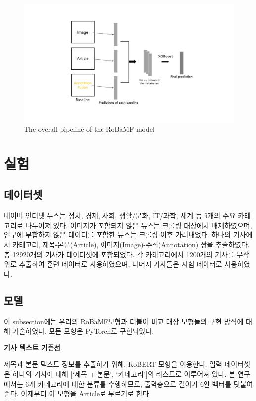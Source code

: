 \documentclass{article}
\begin{document}
\begin{figure}[ht]
    \centering
    \includegraphics[width=\columnwidth]{ENG/fig.1.jpg}
    \caption{The overall pipeline of the RoBaMF model}
    \label{fig.1}
\end{figure}

\section{실험}
\subsection{데이터셋}
네이버 인터넷 뉴스는 정치, 경제, 사회, 생활/문화, IT/과학, 세계 등 6개의 주요 카테고리로 나누어져 있다. 이미지가 포함되지 않은 뉴스는 크롤링 대상에서 배제하였으며, 연구에 부합하지 않은 데이터를 포함한 뉴스는 크롤링 이후 가려내었다. 
하나의 기사에서 카테고리, 제목-본문(Article), 이미지(Image)-주석(Annotation) 쌍을 추출하였다.
총 12920개의 기사가 데이터셋에 포함되었다. 각 카테고리에서 1200개의 기사를 무작위로 추출하여 훈련 데이터로 사용하였으며, 나머지 기사들은 시험 데이터로 사용하였다.


\subsection{모델}
이 subsection에는 우리의 RoBaMF모형과 더불어 비교 대상 모형들의 구현 방식에 대해 기술하였다. 모든 모형은 PyTorch로 구현되었다.


\textbf{기사 텍스트 기준선}

제목과 본문 텍스트 정보를 추출하기 위해, KoBERT 모형을 이용한다.
입력 데이터셋은 하나의 기사에 대해 [‘제목 + 본문’, ‘카테고리’]의 리스트로 이루어져 있다.
본 연구에서는 6개 카테고리에 대한 분류를 수행하므로, 출력층으로 길이가 6인 벡터를 덧붙여준다.
이제부터 이 모형을 Article로 부르기로 한다.
\end{document}
